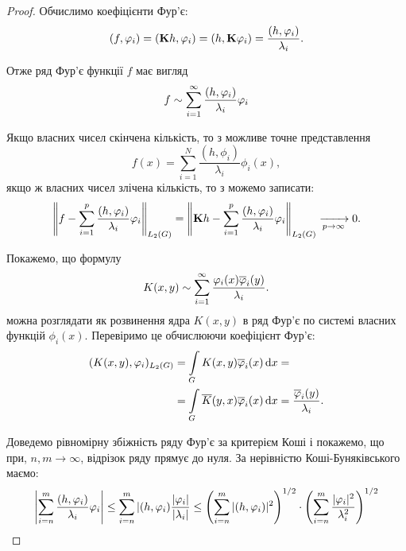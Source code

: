 \begin{proof}
	Обчислимо коефіцієнти Фур'є:
	\begin{equation}
		(f, \phi_i) = (\bf{K}h, \phi_i) = (h, \bf{K}\phi_i) = \frac{(h,\phi_i)}{\lambda_i}.
	\end{equation}

	Отже ряд Фур'є функції $f$ має вигляд 
	\begin{equation}
		f \sim \Sum_{i = 1}^\infty \dfrac{(h, \phi_i)}{\lambda_i} \phi_i
	\end{equation}

	Якщо власних чисел скінчена кількість, то з можливе точне представлення 
	\begin{equation}
		f(x) = \sum_{i=1}^N \frac{(h, \phi_i)}{\lambda_i} \phi_i(x),
	\end{equation}
	якщо ж власних чисел злічена кількість, то з можемо записати:
	\begin{equation}
		\left\| f - \Sum_{i = 1}^p \dfrac{(h, \phi_i)}{\lambda_i} \phi_i \right\|_{L_2(G)} = \left\| \bf{K}h - \Sum_{i = 1}^p \dfrac{(h, \phi_i)}{\lambda_i} \phi_i \right\|_{L_2(G)} \xrightarrow[p \to \infty]{}0.
	\end{equation}

	Покажемо, що формулу 
	\begin{equation}
		K(x, y) \sim \Sum_{i = 1}^\infty \dfrac{\phi_i(x) \overline \phi_i(y)}{\lambda_i}.
	\end{equation}
	можна розглядати як розвинення ядра $K(x, y)$ в ряд Фур'є по системі власних функцій $\phi_i(x)$. Перевіримо це обчислюючи коефіцієнт Фур'є:
	\begin{equation}
		\begin{aligned}
			(K(x, y),\phi_i)_{L_2(G)} &= \Int_G K(x, y) \overline \phi_i(x) \diff x = \\
			&= \Int_G \overline K(y, x) \overline \phi_i(x) \diff x = \dfrac{\overline \phi_i(y)}{\lambda_i}.
		\end{aligned}
	\end{equation}

	Доведемо рівномірну збіжність ряду Фур'є за критерієм Коші і покажемо, що при, $n, m \to \infty$, відрізок ряду прямує до нуля. За нерівністю Коші-Буняківського маємо:
	\begin{equation}
		\left| \Sum_{i = n}^m \dfrac{(h, \phi_i)}{\lambda_i} \phi_i \right| \le \Sum_{i = n}^m |(h, \phi_i)\dfrac{|\phi_i|}{|\lambda_i|} \le \left(\Sum_{i=n}^m |(h, \phi_i)|^2\right)^{1/2} \cdot \left(\Sum_{i=n}^m \dfrac{|\phi_i|^2}{\lambda_i^2}\right)^{1/2}
	\end{equation}


\end{proof}
